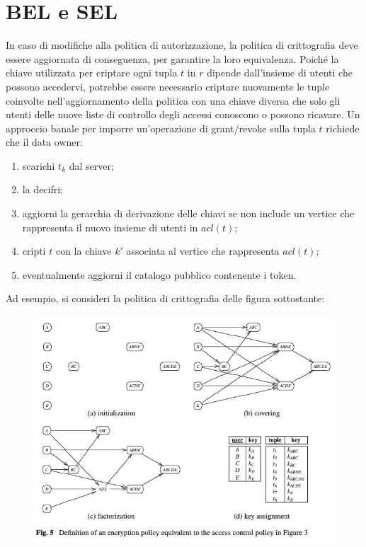 \section{BEL e SEL}
In caso di modifiche alla politica di autorizzazione, la politica di crittografia deve essere aggiornata di conseguenza, per garantire la loro equivalenza. Poiché la chiave utilizzata per criptare ogni tupla $t$ in $r$ dipende dall'insieme di utenti che possono accedervi, potrebbe essere necessario criptare nuovamente le tuple coinvolte nell'aggiornamento della politica con una chiave diversa che solo gli utenti delle nuove liste di controllo degli accessi conoscono o possono ricavare. Un approccio banale per imporre un'operazione di grant/revoke sulla tupla $t$ richiede che il data owner:
\begin{enumerate}[label=\roman*)]
    \item scarichi $t_k$ dal server;
    \item la decifri;
    \item aggiorni la gerarchia di derivazione delle chiavi se non include un vertice che rappresenta il nuovo insieme di utenti in $acl(t)$;
    \item cripti $t$ con la chiave $k'$ associata al vertice che rappresenta $acl(t)$;
    \item eventualmente aggiorni il catalogo pubblico contenente i token.
\end{enumerate}
Ad esempio, si consideri la politica di crittografia delle figura sottostante:
\begin{figure}[h!]
    \centering
    \includegraphics[width=1\linewidth]{paper_selective-and-private-access-to-outsourced-data-centers/image2.png}
    \label{fig:fig-3}
\end{figure}

